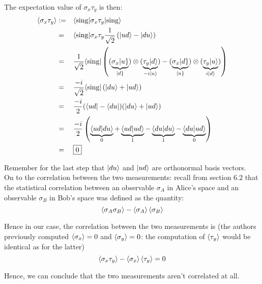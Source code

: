 \documentclass[solutions.tex]{subfiles}
\begin{document}
The expectation value of $\sigma_x\tau_y$ is then:
\begin{equation*}\begin{aligned}
	\left\langle \sigma_x\tau_y \right\rangle &:=&& \langle \text{sing}|\sigma_x\tau_y|\text{sing}\rangle \\
	~ &=&& \langle \text{sing}|\sigma_x\tau_y\frac{1}{\sqrt2}\left(|ud\rangle-|du\rangle\right) \\
	~ &=&& \frac1{\sqrt2}\langle \text{sing}|\left(
		(\underbrace{\sigma_x|u\}}_{|d\}})\otimes(\underbrace{\tau_y|d\rangle}_{
			-i|u\rangle})
		- (\underbrace{\sigma_x|d\}}_{|u\}})\otimes(\underbrace{\tau_y|u\rangle}_{
			i|d\rangle
		})
	\right) \\
	~ &=&& \frac{-i}{\sqrt2}\langle \text{sing}|\left(|du\rangle+|ud\rangle\right) \\
	~ &=&& \frac{-i}2(\langle ud|-\langle du|)(|du\rangle+|ud\rangle) \\
	~ &=&& \frac{-i}2\left(\underbrace{\left\langle ud \middle| du \right\rangle}_{0}
		+\underbrace{\left\langle ud \middle| ud \right\rangle}_{1}
		-\underbrace{\left\langle du \middle| du \right\rangle}_{1}
		-\underbrace{\left\langle du \middle| ud \right\rangle}_{0}\right) \\
	~ &=&& \boxed{0} \\
\end{aligned}\end{equation*}

Remember for the last step that $|du\rangle$ and $|ud\rangle$ are orthonormal
basis vectors. \\

On to the correlation between the two measurements: recall from section $6.2$
that the statistical correlation between an observable $\sigma_A$ in Alice's
space and an observable $\sigma_B$ in Bob's space was defined as the quantity:
\[
	\left\langle \sigma_A\sigma_B \right\rangle -\left\langle \sigma_A \right\rangle\left\langle \sigma_B \right\rangle
\]

Hence in our case, the correlation between the two measurements is (the
authors previously computed $\left\langle \sigma_x \right\rangle = 0$ and $\left\langle \sigma_y \right\rangle = 0$: the
computation of $\left\langle \tau_y \right\rangle$ would be identical as for the latter)
\[
	\left\langle \sigma_x\tau_y \right\rangle -\left\langle \sigma_x \right\rangle\left\langle \tau_y \right\rangle = 0
\]

Hence, we can conclude that the two measurements aren't correlated at all.
\end{document}
